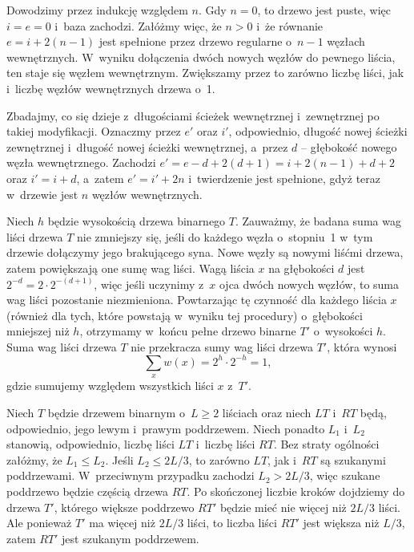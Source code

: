 \exercise %
Dowodzimy przez indukcję względem $n$. Gdy $n=0$, to drzewo jest puste, więc $i=e=0$ i~baza zachodzi. Załóżmy więc, że $n>0$ i~że równanie $e=i+2(n-1)$ jest spełnione przez drzewo regularne o~$n-1$ węzłach wewnętrznych. W~wyniku dołączenia dwóch nowych węzłów do pewnego liścia, ten staje się węzłem wewnętrznym. Zwiększamy przez to zarówno liczbę liści, jak i~liczbę węzłów wewnętrznych drzewa o~1.

Zbadajmy, co się dzieje z~długościami ścieżek wewnętrznej i~zewnętrznej po takiej modyfikacji. Oznaczmy przez $e'$ oraz $i'$, odpowiednio, długość nowej ścieżki zewnętrznej i~długość nowej ścieżki wewnętrznej, a~przez $d$ -- głębokość nowego węzła wewnętrznego. Zachodzi $e'=e-d+2(d+1)=i+2(n-1)+d+2$ oraz $i'=i+d$, a~zatem $e'=i'+2n$ i~twierdzenie jest spełnione, gdyż teraz w~drzewie jest $n$ węzłów wewnętrznych.

\exercise %
Niech $h$ będzie wysokością drzewa binarnego $T$. Zauważmy, że badana suma wag liści drzewa $T$ nie zmniejszy się, jeśli do każdego węzła o~stopniu~1 w~tym drzewie dołączymy jego brakującego syna. Nowe węzły są nowymi liśćmi drzewa, zatem powiększają one sumę wag liści. Wagą liścia $x$ na głębokości $d$ jest $2^{-d}=2\cdot2^{-(d+1)}$, więc jeśli uczynimy z~$x$ ojca dwóch nowych węzłów, to suma wag liści pozostanie niezmieniona. Powtarzając tę czynność dla każdego liścia $x$ (również dla tych, które powstają w~wyniku tej procedury) o~głębokości mniejszej niż $h$, otrzymamy w~końcu pełne drzewo binarne $T'$ o~wysokości $h$. Suma wag liści drzewa $T$ nie przekracza sumy wag liści drzewa $T'$, która wynosi
\[
	\sum_{x}w(x) = 2^h\cdot2^{-h} = 1,
\]
gdzie sumujemy względem wszystkich liści $x$ z~$T'$.

\exercise %

\noindent Niech $T$ będzie drzewem binarnym o~$L\ge2$ liściach oraz niech $LT$ i~$RT$ będą, odpowiednio, jego lewym i~prawym poddrzewem. Niech ponadto $L_1$ i~$L_2$ stanowią, odpowiednio, liczbę liści $LT$ i~liczbę liści $RT$. Bez straty ogólności załóżmy, że $L_1\le L_2$. Jeśli $L_2\le2L/3$, to zarówno $LT$, jak i~$RT$ są szukanymi poddrzewami. W~przeciwnym przypadku zachodzi $L_2>2L/3$, więc szukane poddrzewo będzie częścią drzewa $RT$. Po skończonej liczbie kroków dojdziemy do drzewa $T'$, którego większe poddrzewo $RT'$ będzie mieć nie więcej niż $2L/3$ liści. Ale ponieważ $T'$ ma więcej niż $2L/3$ liści, to liczba liści $RT'$ jest większa niż $L/3$, zatem $RT'$ jest szukanym poddrzewem.

